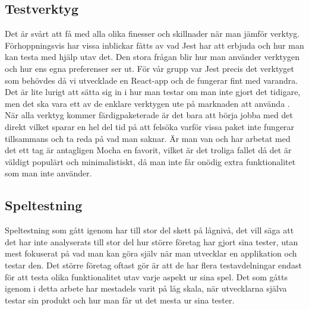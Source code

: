 \subsection{Testverktyg} 
\label{subsec:david-discussion-jest}
Det är svårt att få med alla olika finesser och skillnader när man jämför verktyg. Förhoppningsvis har vissa inblickar fåtts av vad Jest har att erbjuda och hur man kan testa med hjälp utav det. Den stora frågan blir hur man använder verktygen och hur ens egna preferenser ser ut. För vår grupp var Jest precis det verktyget som behövdes då vi utvecklade en React-app och de fungerar fint med varandra. Det är lite lurigt att sätta sig in i hur man testar om man inte gjort det tidigare, men det ska vara ett av de enklare verktygen ute på marknaden att använda \cite{bib-jest-easy}. När alla verktyg kommer färdigpaketerade är det bara att börja jobba med det direkt vilket sparar en hel del tid på att felsöka varför vissa paket inte fungerar tillsammans och ta reda på vad man saknar. Är man van och har arbetat med det ett tag är antagligen Mocha en favorit, vilket är det troliga fallet då det är väldigt populärt och minimalistiskt, då man inte får onödig extra funktionalitet som man inte använder. 

\subsection{Speltestning}
\label{subsec:david-discussion-speltestning}
Speltestning som gått igenom har till stor del skett på lågnivå, det vill säga att det har inte analyserats till stor del hur större företag har gjort sina tester, utan mest fokuserat på vad man kan göra själv när man utvecklar en applikation och testar den. Det större företag oftast gör är att de har flera testavdelningar endast för att testa olika funktionalitet utav varje aspekt ur sina spel. Det som gåtts igenom i detta arbete har mestadels varit på låg skala, när utvecklarna själva testar sin produkt och hur man får ut det mesta ur sina tester. 